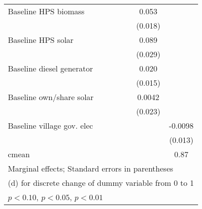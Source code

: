 \begin{table}[htbp]
\begin{tabular*}{1\hsize}{@{\hskip\tabcolsep\extracolsep\fill}l*{6}{c}}
Baseline HPS biomass&                  &                  &                  &                  &    0.053\sym{***}&                  \\
                &                  &                  &                  &                  &  (0.018)         &                  \\
Baseline HPS solar&                  &                  &                  &                  &    0.089\sym{***}&                  \\
                &                  &                  &                  &                  &  (0.029)         &                  \\
Baseline diesel generator&                  &                  &                  &                  &    0.020         &                  \\
                &                  &                  &                  &                  &  (0.015)         &                  \\
Baseline own/share solar&                  &                  &                  &                  &   0.0042         &                  \\
                &                  &                  &                  &                  &  (0.023)         &                  \\
Baseline village gov. elec&                  &                  &                  &                  &                  &  -0.0098         \\
                &                  &                  &                  &                  &                  &  (0.013)         \\
\midrule
cmean           &                  &                  &                  &                  &                  &     0.87         \\
\bottomrule
\multicolumn{7}{l}{\footnotesize Marginal effects; Standard errors in parentheses}\\
\multicolumn{7}{l}{\footnotesize  (d) for discrete change of dummy variable from 0 to 1}\\
\multicolumn{7}{l}{\footnotesize \sym{*} \(p<0.10\), \sym{**} \(p<0.05\), \sym{***} \(p<0.01\)}\\
\end{tabular*}
\end{table}
